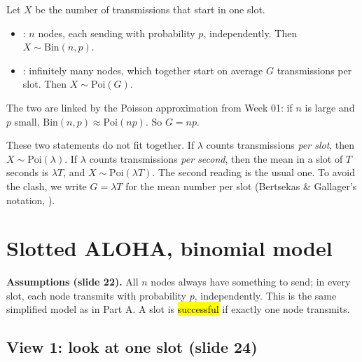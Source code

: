 \begin{defn}
Let $X$ be the number of transmissions that start in one slot.
\begin{itemize}
  \item {}: $n$ nodes, each sending with probability $p$, independently. Then $X\sim\text{Bin}(n,p)$.
  \item {}: infinitely many nodes, which together start on average $G$ transmissions per slot. Then $X\sim\text{Poi}(G)$.
\end{itemize}
The two are linked by the Poisson approximation from Week 01: if $n$ is large and $p$ small, $\text{Bin}(n,p)\approx\text{Poi}(np)$. So $G = np$.
\end{defn}

\begin{pitfall}
These two statements do not fit together. If $\lambda$ counts transmissions \emph{per slot}, then $X\sim\text{Poi}(\lambda)$. If $\lambda$ counts transmissions \emph{per second},
then the mean in a slot of $T$ seconds is $\lambda T$, and $X\sim\text{Poi}(\lambda T)$. The second reading is the usual one. To avoid the clash, we write $G = \lambda T$ for the mean number per slot (Bertsekas \& Gallager's notation, ).
\end{pitfall}

\section{Slotted ALOHA, binomial model}

\textbf{Assumptions (slide 22).} All $n$ nodes always have something to send; in every slot, each node transmits with probability $p$, independently. This is the same simplified model as in Part A.
A slot is \hl{successful} if exactly one node transmits.

\subsection{View 1: look at one slot (slide 24)}

